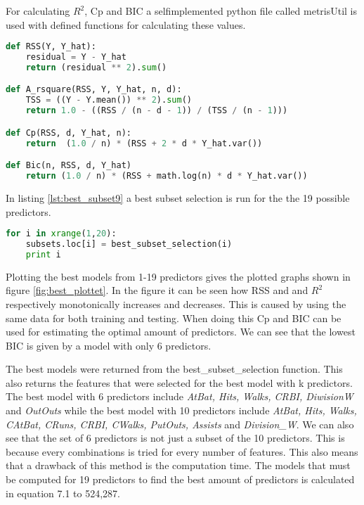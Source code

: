 For calculating $R^2$, Cp and BIC a selfimplemented python file called metrisUtil is used with defined functions for calculating these values.

\begin{lstlisting}[language=Python, label=lst:metricsUtil, caption=metricsUtil for calculating Cp\, BIC and RSS]
def RSS(Y, Y_hat):
	residual = Y - Y_hat
	return (residual ** 2).sum()

def A_rsquare(RSS, Y, Y_hat, n, d):
	TSS = ((Y - Y.mean()) ** 2).sum()
	return 1.0 - ((RSS / (n - d - 1)) / (TSS / (n - 1)))

def Cp(RSS, d, Y_hat, n):
	return  (1.0 / n) * (RSS + 2 * d * Y_hat.var())

def Bic(n, RSS, d, Y_hat)
	return (1.0 / n) * (RSS + math.log(n) * d * Y_hat.var())
\end{lstlisting}

In listing \ref{lst:best_subset9} a best subset selection is run for the the 19 possible predictors.

\begin{lstlisting}[language=Python, label=lst:best_subset9, caption=metricsUtil for calculating Cp\, BIC and RSS]
for i in xrange(1,20):
	subsets.loc[i] = best_subset_selection(i)
	print i
\end{lstlisting}

Plotting the best models from 1-19 predictors gives the plotted graphs shown in figure \ref{fig:best_plottet}. In the figure it can be seen how RSS and and $R^2$ respectively monotonically increases and decreases. This is caused by using the same data for both training and testing. When doing this Cp and BIC can be used for estimating the optimal amount of predictors. We can see that the lowest BIC is given by a model with only 6 predictors.



The best models were returned from the best\_subset\_selection function. This also returns the features that were selected for the best model with k predictors. The best model with 6 predictors include \emph{AtBat, Hits, Walks, CRBI, DiwisionW} and \emph{OutOuts} while the best model with 10 predictors include \emph{AtBat, Hits, Walks, CAtBat, CRuns, CRBI, CWalks, PutOuts, Assists} and \emph{Division\_W}. We can also see that the set of 6 predictors is not just a subset of the 10 predictors. This is because every combinations is tried for every number of features. This also means that a drawback of this method is the computation time. The models that must be computed for 19 predictors to find the best amount of predictors is calculated in equation 7.1 to 524,287.

